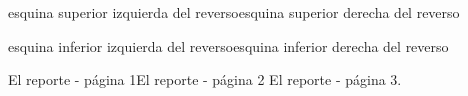 \documentclass[
sinreverso,
conreporte,
]{factura}
\begin{document}
\begin{factura}
\end{factura}


\begin{reverso}
esquina superior izquierda del reverso\hfill esquina superior derecha del reverso\par
\vfill
esquina inferior izquierda del reverso\hfill esquina inferior derecha del reverso
\end{reverso}

\begin{reporte}
 El reporte - página 1\newpage El reporte - página 2 \newpage El reporte - página 3.
 \vspace{1.5cm}\FirmaReporte
\end{reporte}

\Ejemplo
\end{document}
